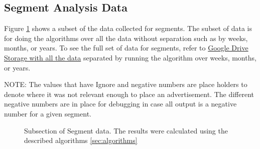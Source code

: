 \documentclass[titlepage,twocolumn]{article}
\begin{document}
\clearpage

\subsection{Segment Analysis Data}
\label{seg:segmentAnalysisData}
\par Figure \ref{tab:tableSegmentSub} shows a subset of the data collected for segments. The subset of data is for doing the algorithms over all the data without separation such as by weeks, months, or years. To see the full set of data for segments, refer to \href{https://drive.google.com/open?id=1KnAJ8UV93-lr22eLf4HYYnbGWTztoq32c8p617_udOw}{Google Drive Storage with all the data} separated by running the algorithm over weeks, months, or years.


\par NOTE: The values that have Ignore and negative numbers are place holders to denote where it was not relevant enough to place an advertisement. The different negative numbers are in place for debugging in case all output is a negative number for  a given segment.

\begin{figure}[htbp]
	\centering
  
  \label{tab:tableSegmentSub}%
\caption{Subsection of Segment data. The results were calculated using the described algorithms \ref{sec:algorithms} }
\end{figure}%


\clearpage
\twocolumn
\end{document}
